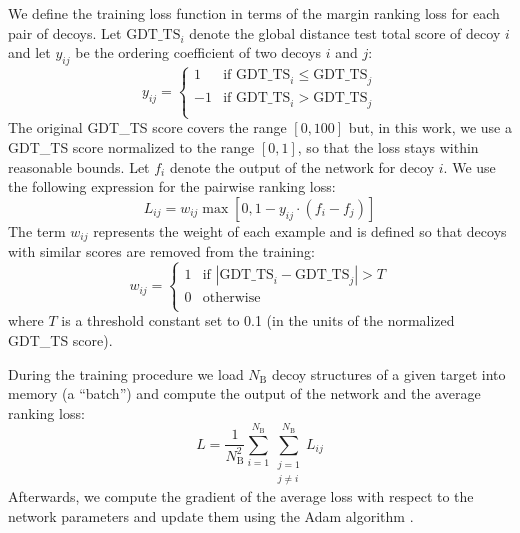 \documentclass{bioinfo}
\begin{document}
We define the training loss function in terms of
the margin ranking loss \citep{joachims2002optimizing, gong2013deep}
for each pair of decoys.  Let $\text{GDT\_TS}_i$ denote the global
distance test total score of decoy $i$ and let $y_{ij}$ be the
ordering coefficient of two decoys $i$ and $j$:
\begin{equation}
y_{ij} = \begin{cases}
               1& \text{if }\text{GDT\_TS}_i \leq \text{GDT\_TS}_j \\
               -1& \text{if }\text{GDT\_TS}_i > \text{GDT\_TS}_j \\
            \end{cases}
\end{equation}
The original GDT\_TS score covers the range $[0,100]$ but, in this
work, we use a GDT\_TS score normalized to the range $[0,1]$, so that
the loss stays within reasonable bounds.  Let $f_i$ denote the output
of the network for decoy $i$. We use the following expression for the
pairwise ranking loss:
\begin{equation}
L_{ij} = w_{ij} \max \left[ 0, 1 - y_{ij} \cdot (f_i - f_j) \right]
\end{equation}
The term $w_{ij}$ represents the weight of each example and is defined
so that decoys with similar scores are removed from the training:
\begin{equation}
w_{ij} = \begin{cases}
               1& \text{if } \left| \text{GDT\_TS}_i - \text{GDT\_TS}_j \right| > T \\
               0& \text{otherwise} \\ 
            \end{cases}
\end{equation}
where $T$ is a threshold constant set to 0.1 (in the units of the
normalized GDT\_TS score).

During the training procedure we load $N_\text{B}$ decoy structures of
a given target into memory (a ``batch'') and compute the output of the
network and the average ranking loss:
\begin{equation}
L = \frac{1}{N_\text{B}^2} \sum_{i=1}^{N_\text{B}}\sum_{\substack{j=1\\j\neq i}}^{N_\text{B}} L_{ij}
\end{equation}
Afterwards, we compute the gradient of the average loss with respect
to the network parameters and update them using the Adam algorithm
\citep{kingma2014adam}.
%
\end{document}

